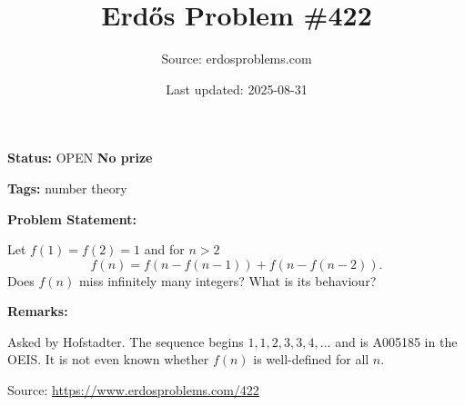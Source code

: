 \documentclass{article}
\title{Erd\H{o}s Problem \#422}
\date{Last updated: 2025-08-31}
\author{Source: erdosproblems.com}
\begin{document}
\maketitle

\noindent\textbf{Status:} OPEN \quad \textbf{No prize}

\noindent\textbf{Tags:} number theory

\medskip
\noindent\textbf{Problem Statement:}

Let $f(1)=f(2)=1$ and for $n>2$\[f(n) = f(n-f(n-1))+f(n-f(n-2)).\]Does $f(n)$ miss infinitely many integers? What is its behaviour?

\bigskip
\noindent\textbf{Remarks:}

Asked by Hofstadter. The sequence begins $1,1,2,3,3,4,\ldots$ and is A005185 in the OEIS. It is not even known whether $f(n)$ is well-defined for all $n$.

\bigskip
\noindent\small{Source: \url{https://www.erdosproblems.com/422}}
\end{document}
